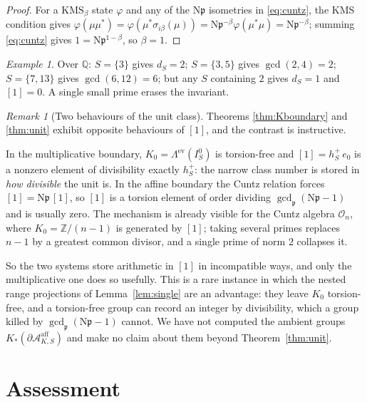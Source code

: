 \documentclass[11pt]{amsart}
\numberwithin{equation}{section}
\theoremstyle{definition}
\theoremstyle{remark}
\newtheorem{remark}[theorem]{Remark}
\newtheorem{example}[theorem]{Example}
\newcommand{\Z}{\mathbb{Z}}
\newcommand{\Q}{\mathbb{Q}}
\newcommand{\cA}{\mathcal{A}}
\newcommand{\cO}{\mathcal{O}}
\newcommand{\pp}{\mathfrak{p}}
\newcommand{\Ns}{\mathrm{N}}
\begin{document}
\begin{proof}
For a $\mathrm{KMS}_\beta$ state $\varphi$ and any of the $\Ns\pp$ isometries in
\eqref{eq:cuntz}, the KMS condition gives
$\varphi(\mu\mu^*)=\varphi(\mu^*\sigma_{i\beta}(\mu))=\Ns\pp^{-\beta}\varphi(\mu^*\mu)=\Ns\pp^{-\beta}$;
summing \eqref{eq:cuntz} gives $1=\Ns\pp^{1-\beta}$, so $\beta=1$.
\end{proof}

\begin{example}
Over $\Q$: $S=\{3\}$ gives $d_S=2$; $S=\{3,5\}$ gives $\gcd(2,4)=2$; $S=\{7,13\}$ gives
$\gcd(6,12)=6$; but any $S$ containing $2$ gives $d_S=1$ and $[1]=0$. A single small prime
erases the invariant.
\end{example}

\begin{remark}[Two behaviours of the unit class]\label{rem:twounits}
Theorems \ref{thm:Kboundary} and \ref{thm:unit} exhibit opposite behaviours of $[1]$, and
the contrast is instructive.

In the multiplicative boundary, $K_0=\Lambda^{\mathrm{ev}}(I_S^0)$ is torsion-free and
$[1]=h^+_S\,e_0$ is a nonzero element of divisibility exactly $h^+_S$: the narrow class
number is stored in \emph{how divisible} the unit is. In the affine boundary the Cuntz
relation forces $[1]=\Ns\pp\,[1]$, so $[1]$ is a torsion element of order dividing
$\gcd_\pp(\Ns\pp-1)$ and is usually zero. The mechanism is already visible for the Cuntz
algebra $\cO_n$, where $K_0=\Z/(n-1)$ is generated by $[1]$; taking several primes replaces
$n-1$ by a greatest common divisor, and a single prime of norm $2$ collapses it.

So the two systems store arithmetic in $[1]$ in incompatible ways, and only the
multiplicative one does so usefully. This is a rare instance in which the nested range
projections of Lemma~\ref{lem:single} are an advantage: they leave $K_0$ torsion-free, and a
torsion-free group can record an integer by divisibility, which a group killed by
$\gcd_\pp(\Ns\pp-1)$ cannot. We have not computed the ambient groups
$K_*(\partial\cA^{\mathrm{aff}}_{K,S})$ and make no claim about them beyond
Theorem~\ref{thm:unit}.
\end{remark}

\section{Assessment}
\end{document}
